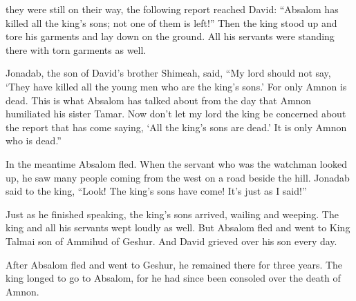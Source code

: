 {they
were still on
their way,
the following report
reached
David: “Absalom
has killed
all
the king’s
sons;
not
one
of them
is left!”
Then
the king
stood up and tore
his garments
and lay
down on the ground.
All
his servants
were standing
there with torn
garments as well.
\par }{\PP {}Jonadab,
the son
of David’s
brother
Shimeah,
said,
“My lord
should not
say,
‘They have killed
all
the young men
who are the king’s
sons.’
For
only
Amnon
is dead.
This
is what Absalom
has talked
about from the day
that Amnon humiliated
his sister
Tamar.
Now
don’t
let
my lord
the king
be concerned
about the report
that has
come saying,
‘All
the king’s
sons
are dead.’
It is
only
Amnon
who is dead.”
\par }{\PP {}In the meantime Absalom
fled.
When the servant
who was the watchman
looked up,
he saw
many
people
coming
from the west on a road
beside
the hill.
Jonadab
said
to
the king,
“Look! The king’s
sons
have come! It’s just
as I
said!”
\par }{\PP {}Just as he finished
speaking,
the king’s
sons
arrived,
wailing
and weeping.
The king
and all
his servants
wept
loudly
as well.
But Absalom
fled
and went
to
King
Talmai
son
of Ammihud
of Geshur.
And David grieved
over
his son
every
day.
\par }{\PP {}After Absalom
fled
and went
to Geshur,
he remained
there
for three
years.
The king
longed
to go
to
Absalom,
for
he
had since been consoled
over
the death
of Amnon.

}
